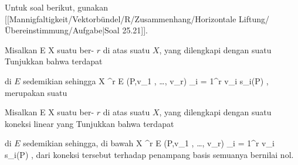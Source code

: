 Untuk soal berikut, gunakan
[[Mannigfaltigkeit/Vektorbündel/R/Zusammenhang/Horizontale Liftung/Übereinstimmung/Aufgabe|Soal 25.21]].

{}
{

Misalkan
 { E } { X
} {}
suatu
ber-
$r$ di atas suatu
$X$, yang dilengkapi dengan suatu
Tunjukkan bahwa terdapat
 {} {}

 di $E$ sedemikian sehingga
\maabbeledisp {} {X \times \R^r} { E
} {(P,v_1  , \ldots , v_r)} { \sum_{i = 1}^r v_i s_i(P)
} {,}
merupakan suatu

}
{} {}

{}
{

Misalkan
 { E } { X
} {}
suatu
ber-
$r$ di atas suatu
$X$, yang dilengkapi dengan suatu koneksi linear yang
Tunjukkan bahwa terdapat
 {} {}

 di $E$ sedemikian sehingga, di bawah
\maabbeledisp {} {X \times \R^r} { E
} {(P,v_1 , \ldots , v_r)} { \sum_{i = 1}^r v_i s_i(P)
} {,}
dari koneksi tersebut terhadap penampang basis
 semuanya bernilai nol.

}
{} {}

